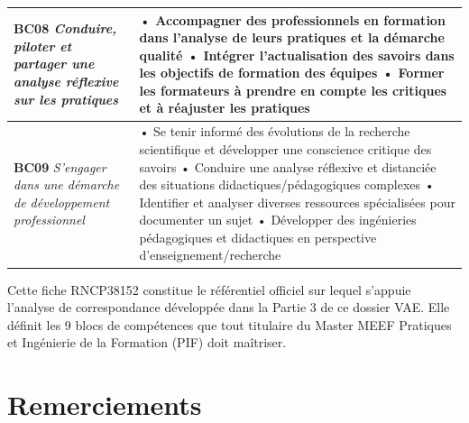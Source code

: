 \documentclass[12pt,a4paper]{report}
\begin{document}
{\begin{longtable}{|p{4cm}|p{10.5cm}|}
\textbf{BC08} \newline
\textit{Conduire, piloter et partager une analyse réflexive sur les pratiques} &
• Accompagner des professionnels en formation dans l'analyse de leurs pratiques et la démarche qualité \newline
• Intégrer l'actualisation des savoirs dans les objectifs de formation des équipes \newline
• Former les formateurs à prendre en compte les critiques et à réajuster les pratiques \\
\hline

\textbf{BC09} \newline
\textit{S'engager dans une démarche de développement professionnel} &
• Se tenir informé des évolutions de la recherche scientifique et développer une conscience critique des savoirs \newline
• Conduire une analyse réflexive et distanciée des situations didactiques/pédagogiques complexes \newline
• Identifier et analyser diverses ressources spécialisées pour documenter un sujet \newline
• Développer des ingénieries pédagogiques et didactiques en perspective d'enseignement/recherche \\
\hline

\end{longtable}

}

\vspace{1cm}

Cette fiche RNCP38152 constitue le référentiel officiel sur lequel s'appuie l'analyse de correspondance développée dans la Partie 3 de ce dossier VAE. Elle définit les 9 blocs de compétences que tout titulaire du Master MEEF Pratiques et Ingénierie de la Formation (PIF) doit maîtriser.

\newpage


\chapter*{Remerciements}
\enlargethispage{3cm}
\vspace{-1cm}
\end{document}
